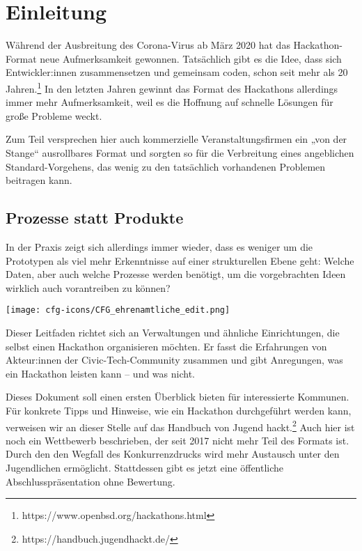 

\setchapterpreamble[u]{\margintoc}
\chapter{Einleitung}


Während der Ausbreitung des Corona-Virus ab März 2020 hat das Ha\-cka\-thon-Format neue Aufmerksamkeit gewonnen. Tatsächlich gibt es die Idee, dass sich Entwickler:innen zusammensetzen und gemeinsam coden, schon seit mehr als 20 Jahren.\footnote{https://www.openbsd.org/hackathons.html} In den letzten Jahren gewinnt das Format des Hackathons allerdings immer mehr Aufmerksamkeit, weil es die Hoffnung auf schnelle Lösungen für große Probleme weckt.

Zum Teil versprechen hier auch kommerzielle Veranstaltungsfirmen ein „von der Stange“ ausrollbares Format und sorgten so für die Verbreitung eines angeblichen Standard-Vorgehens, das wenig zu den tatsächlich vorhandenen Problemen beitragen kann.

\section*{Prozesse statt Produkte}

In der Praxis zeigt sich allerdings immer wieder, dass es weniger um die Prototypen als viel mehr Erkenntnisse auf einer strukturellen Ebene geht: Welche Daten, aber auch welche Prozesse werden benötigt, um die vorgebrachten Ideen wirklich auch vorantreiben zu können?

\begin{marginfigure}[-0.5cm]
	\texttt{[image: cfg-icons/CFG\_ehrenamtliche\_edit.png]}
\end{marginfigure}

Dieser Leitfaden richtet sich an Verwaltungen und ähnliche Einrichtungen, die selbst einen Hackathon organisieren möchten. Er fasst die Erfahrungen von Akteur:innen der Civic-Tech-Community zusammen und gibt Anregungen, was ein Hackathon leisten kann – und was nicht.

Dieses Dokument soll einen ersten Überblick bieten für interessierte Kommunen. Für konkrete Tipps und Hinweise, wie ein Hackathon durchgeführt werden kann, verweisen wir an dieser Stelle auf das Handbuch von Jugend hackt.\footnote{https://handbuch.jugendhackt.de/} Auch hier ist noch ein Wettbewerb beschrieben, der seit 2017 nicht mehr Teil des Formats ist. Durch den den Wegfall des Konkurrenzdrucks wird mehr Austausch unter den Jugendlichen ermöglicht. Stattdessen gibt es jetzt eine öffentliche Abschlusspräsentation ohne Bewertung.

